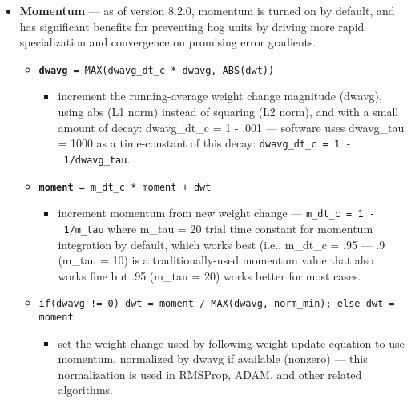 \begin{itemize}
\tightlist
\item
  \textbf{Momentum} --- as of version 8.2.0, momentum is turned on by
  default, and has significant benefits for preventing hog units by
  driving more rapid specialization and convergence on promising error
  gradients.

  \begin{itemize}
  \tightlist
  \item
    \textbf{\texttt{dwavg}}\texttt{\ =\ MAX(dwavg\_dt\_c\ *\ dwavg,\ ABS(dwt))}

    \begin{itemize}
    \tightlist
    \item
      increment the running-average weight change magnitude (dwavg),
      using abs (L1 norm) instead of squaring (L2 norm), and with a
      small amount of decay: dwavg\_dt\_c = 1 - .001 --- software uses
      dwavg\_tau = 1000 as a time-constant of this decay:
      \texttt{dwavg\_dt\_c\ =\ 1\ -\ 1/dwavg\_tau}.
    \end{itemize}
  \item
    \textbf{\texttt{moment}}\texttt{\ =\ m\_dt\_c\ *\ moment\ +\ dwt}

    \begin{itemize}
    \tightlist
    \item
      increment momentum from new weight change ---
      \texttt{m\_dt\_c\ =\ 1\ -\ 1/m\_tau} where m\_tau = 20 trial time
      constant for momentum integration by default, which works best
      (i.e., m\_dt\_c = .95 --- .9 (m\_tau = 10) is a
      traditionally-used momentum value that also works fine but .95
      (m\_tau = 20) works better for most cases.
    \end{itemize}
  \item
    \texttt{if(dwavg\ !=\ 0)\ dwt\ =\ moment\ /\ MAX(dwavg,\ norm\_min);\ else\ dwt\ =\ moment}

    \begin{itemize}
    \tightlist
    \item
      set the weight change used by following weight update equation to
      use momentum, normalized by dwavg if available (nonzero) --- this
      normalization is used in RMSProp, ADAM, and other related
      algorithms.
    \end{itemize}
  \end{itemize}
\end{itemize}

